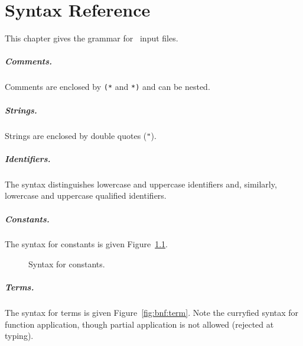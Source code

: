\chapter{Syntax Reference}
\label{chap:syntaxref}

This chapter gives the grammar for \why\ input files.


\paragraph{Comments.}
Comments are enclosed by \texttt{(*} and \texttt{*)} and can be nested.

\paragraph{Strings.}
Strings are enclosed by double quotes (\verb!"!).


\paragraph{Identifiers.} The syntax distinguishes lowercase and
uppercase identifiers and, similarly, lowercase and uppercase
qualified identifiers.
 
\begin{center}\framebox{}\end{center}

\paragraph{Constants.}
The syntax for constants is given Figure~\ref{fig:bnf:constant}.

\begin{figure}[p]
\begin{center}\framebox{}\end{center}
  \caption{Syntax for constants.}
\label{fig:bnf:constant}
\end{figure}

\paragraph{Terms.}
The syntax for terms is given Figure~\ref{fig:bnf:term}.
Note the curryfied syntax for function application, though partial
application is not allowed (rejected at typing).


